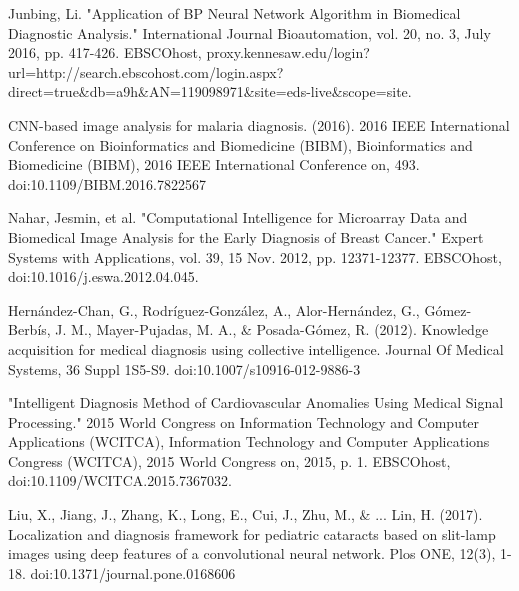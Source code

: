 \documentclass[conference]{IEEEtran}
\begin{document}

%
%
%
\begin{thebibliography}{1}

Junbing, Li. "Application of BP Neural Network Algorithm in Biomedical Diagnostic Analysis." International Journal Bioautomation, vol. 20, no. 3, July 2016, pp. 417-426. EBSCOhost, proxy.kennesaw.edu/login?url=http://search.ebscohost.com/login.aspx?direct=true\&db=a9h\&AN=119098971\&site=eds-live\&scope=site.

CNN-based image analysis for malaria diagnosis. (2016). 2016 IEEE International Conference on Bioinformatics and Biomedicine (BIBM), Bioinformatics and Biomedicine (BIBM), 2016 IEEE International Conference on, 493. doi:10.1109/BIBM.2016.7822567

Nahar, Jesmin, et al. "Computational Intelligence for Microarray Data and Biomedical Image Analysis for the Early Diagnosis of Breast Cancer." Expert Systems with Applications, vol. 39, 15 Nov. 2012, pp. 12371-12377. EBSCOhost, doi:10.1016/j.eswa.2012.04.045.

Hernández-Chan, G., Rodríguez-González, A., Alor-Hernández, G., Gómez-Berbís, J. M., Mayer-Pujadas, M. A., \& Posada-Gómez, R. (2012). Knowledge acquisition for medical diagnosis using collective intelligence. Journal Of Medical Systems, 36 Suppl 1S5-S9. doi:10.1007/s10916-012-9886-3

"Intelligent Diagnosis Method of Cardiovascular Anomalies Using Medical Signal Processing." 2015 World Congress on Information Technology and Computer Applications (WCITCA), Information Technology and Computer Applications Congress (WCITCA), 2015 World Congress on, 2015, p. 1. EBSCOhost, doi:10.1109/WCITCA.2015.7367032.

Liu, X., Jiang, J., Zhang, K., Long, E., Cui, J., Zhu, M., \& ... Lin, H. (2017). Localization and diagnosis framework for pediatric cataracts based on slit-lamp images using deep features of a convolutional neural network. Plos ONE, 12(3), 1-18. doi:10.1371/journal.pone.0168606


\end{thebibliography}
\end{document}
